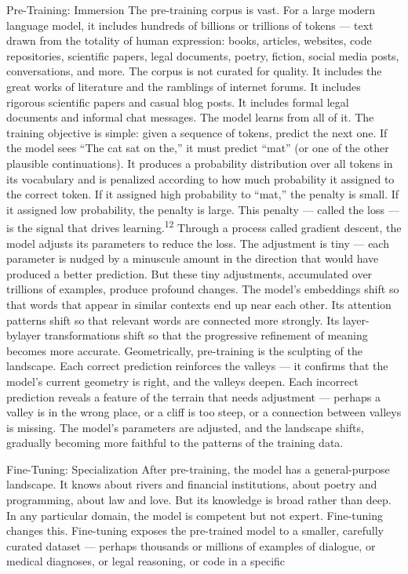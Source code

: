 Pre-Training: Immersion The pre-training corpus is vast. For a large modern language model, it includes hundreds of billions or trillions of tokens — text drawn from the totality of human expression: books, articles, websites, code repositories, scientific papers, legal documents, poetry, fiction, social media posts, conversations, and more. The corpus is not curated for quality. It includes the great works of literature and the ramblings of internet forums. It includes rigorous scientific papers and casual blog posts. It includes formal legal documents and informal chat messages. The model learns from all of it. The training objective is simple: given a sequence of tokens, predict the next one. If the model sees “The cat sat on the,” it must predict “mat” (or one of the other plausible continuations). It produces a probability distribution over all tokens in its vocabulary and is penalized according to how much probability it assigned to the correct token. If it assigned high probability to “mat,” the penalty is small. If it assigned low probability, the penalty is large. This penalty — called the loss — is the signal that drives learning.\textsuperscript{12} Through a process called gradient descent, the model adjusts its parameters to reduce the loss. The adjustment is tiny — each parameter is nudged by a minuscule amount in the direction that would have produced a better prediction. But these tiny adjustments, accumulated over trillions of examples, produce profound changes. The model’s embeddings shift so that words that appear in similar contexts end up near each other. Its attention patterns shift so that relevant words are connected more strongly. Its layer-bylayer transformations shift so that the progressive refinement of meaning becomes more accurate. Geometrically, pre-training is the sculpting of the landscape. Each correct prediction reinforces the valleys — it confirms that the model’s current geometry is right, and the valleys deepen. Each incorrect prediction reveals a feature of the terrain that needs adjustment — perhaps a valley is in the wrong place, or a cliff is too steep, or a connection between valleys is missing. The model’s parameters are adjusted, and the landscape shifts, gradually becoming more faithful to the patterns of the training data.

Fine-Tuning: Specialization After pre-training, the model has a general-purpose landscape. It knows about rivers and financial institutions, about poetry and programming, about law and love. But its knowledge is broad rather than deep. In any particular domain, the model is competent but not expert. Fine-tuning changes this. Fine-tuning exposes the pre-trained model to a smaller, carefully curated dataset — perhaps thousands or millions of examples of dialogue, or medical diagnoses, or legal reasoning, or code in a specific

